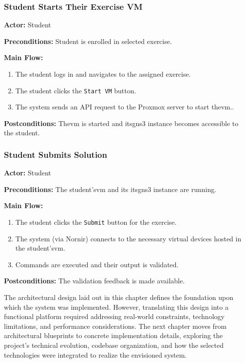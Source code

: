         \subsubsection{Student Starts Their Exercise VM}
        \label{sec:starts_vm}
            \textbf{Actor:} Student

            \textbf{Preconditions:} Student is enrolled in selected exercise.

            \textbf{Main Flow:}
            \begin{enumerate}
                \item The student logs in and navigates to the assigned exercise.
                \item The student clicks the \texttt{Start VM} button.
                \item The system sends an API request to the Proxmox server to start the\ac{vm}..
            \end{enumerate}

            \textbf{Postconditions:} The\ac{vm} is started and its\ac{gns3} instance becomes accessible to the student.

        \subsubsection{Student Submits Solution}
        \label{sec:submit_solution}
            \textbf{Actor:} Student

            \textbf{Preconditions:} The student's\ac{vm} and its its\ac{gns3} instance are running.

            \textbf{Main Flow:}
            \begin{enumerate}
                \item The student clicks the \texttt{Submit} button for the exercise.
                \item The system (via Nornir) connects to the necessary virtual devices hosted in the student's\ac{vm}.
                \item Commands are executed and their output is validated.

            \end{enumerate}

            \textbf{Postconditions:} The validation feedback is made available.

The architectural design laid out in this chapter defines the foundation upon which the system was implemented. However, translating 
this design into a functional platform required addressing real-world constraints, technology limitations, and performance considerations. 
The next chapter moves from architectural blueprints to concrete implementation details, exploring the project's technical evolution, codebase 
organization, and how the selected technologies were integrated to realize the envisioned system.